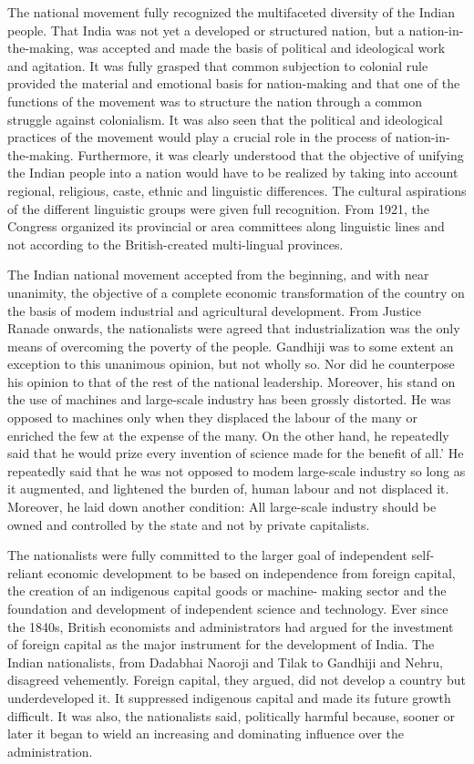 \begin{multicols}{2}
The national movement fully recognized the multifaceted diversity of the Indian people. That India was not yet a developed or structured nation, but a nation-in-the-making, was accepted and made the basis of political and ideological work and agitation. It was fully grasped that common subjection to colonial rule provided the material and emotional basis for nation-making and that one of the functions of the movement was to structure the nation through a common struggle against colonialism. It was also seen that the political and ideological practices of the movement would play a crucial role in the process of nation-in-the-making. Furthermore, it was clearly understood that the objective of unifying the Indian people into a nation would have to be realized by taking into account regional, religious, caste, ethnic and linguistic differences. The cultural aspirations of the different linguistic groups were given full recognition. From 1921, the Congress organized its provincial or area committees along linguistic lines and not according to the British-created multi-lingual provinces.

The Indian national movement accepted from the beginning, and with near unanimity, the objective of a complete economic transformation of the country on the basis of modem industrial and agricultural development. From Justice Ranade onwards, the nationalists were agreed that industrialization was the only means of overcoming the poverty of the people. Gandhiji was to some extent an exception to this unanimous opinion, but not wholly so. Nor did he counterpose his opinion to that of the rest of the national leadership. Moreover, his stand on the use of machines and large-scale industry has been grossly distorted. He was opposed to machines only when they displaced the labour of the many or enriched the few at the expense of the many. On the other hand, he repeatedly said that he would prize every invention of science made for the benefit of all.' He repeatedly said that he was not opposed to modem large-scale industry so long as it augmented, and lightened the burden of, human labour and not displaced it. Moreover, he laid down another condition: All large-scale industry should be owned and controlled by the state and not by private capitalists.

The nationalists were fully committed to the larger goal of independent self-reliant economic development to be based on independence from foreign capital, the creation of an indigenous capital goods or machine- making sector and the foundation and development of independent science and technology. Ever since the 1840s, British economists and administrators had argued for the investment of foreign capital as the major instrument for the development of India. The Indian nationalists, from Dadabhai Naoroji and Tilak to Gandhiji and Nehru, disagreed vehemently. Foreign capital, they argued, did not develop a country but underdeveloped it. It suppressed indigenous capital and made its future growth difficult. It was also, the nationalists said, politically harmful because, sooner or later it began to wield an increasing and dominating influence over the administration.


\end{multicols}
